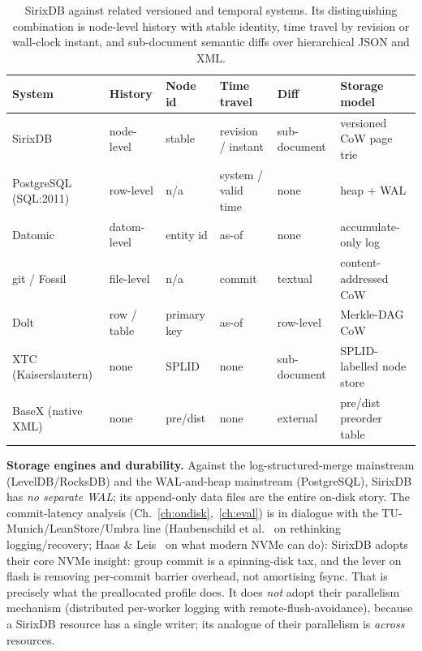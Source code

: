 \documentclass[11pt,a4paper,oneside]{report}
\theoremstyle{sirixthm}
\begin{document}
\begin{table}[h]
\centering\footnotesize\setlength{\tabcolsep}{4pt}\renewcommand{\arraystretch}{1.25}
\begin{tabularx}{\linewidth}{@{}l l l l l X@{}}
\toprule
\textbf{System} & \textbf{History} & \textbf{Node id} & \textbf{Time travel} & \textbf{Diff} & \textbf{Storage model}\\
\midrule
SirixDB & node-level & stable & revision / instant & sub-document & versioned CoW page trie\\
PostgreSQL (SQL:2011) & row-level & n/a & system / valid time & none & heap {+} WAL\\
Datomic & datom-level & entity id & as-of & none & accumulate-only log\\
git / Fossil & file-level & n/a & commit & textual & content-addressed CoW\\
Dolt & row / table & primary key & as-of & row-level & Merkle-DAG CoW\\
XTC (Kaiserslautern) & none & SPLID & none & sub-document & SPLID-labelled node store\\
BaseX (native XML) & none & pre/dist & none & external & pre/dist preorder table\\
\bottomrule
\end{tabularx}
\caption{SirixDB against related versioned and temporal systems. Its distinguishing combination is
node-level history with stable identity, time travel by revision or wall-clock instant, and
sub-document semantic diffs over hierarchical JSON and XML.}
\label{tab:related}
\end{table}

\textbf{Storage engines and durability.} Against the log-structured-merge mainstream
(LevelDB/RocksDB) and the WAL-and-heap mainstream (PostgreSQL), SirixDB has \emph{no separate
WAL}; its append-only data files are the entire on-disk story. The commit-latency analysis
(Ch.~\ref{ch:ondisk},~\ref{ch:eval}) is in dialogue with the TU-Munich/LeanStore/Umbra line
(Haubenschild et al.~\cite{haubenschild} on rethinking logging/recovery; Haas \& Leis~\cite{haas} on what modern NVMe can do):
SirixDB adopts their core NVMe insight: group commit is a spinning-disk tax, and the lever on
flash is removing per-commit barrier overhead, not amortising fsync. That is precisely what
the preallocated profile does. It does \emph{not} adopt their parallelism mechanism
(distributed per-worker logging with remote-flush-avoidance), because a SirixDB resource has a
single writer; its analogue of their parallelism is \emph{across} resources.
\end{document}
